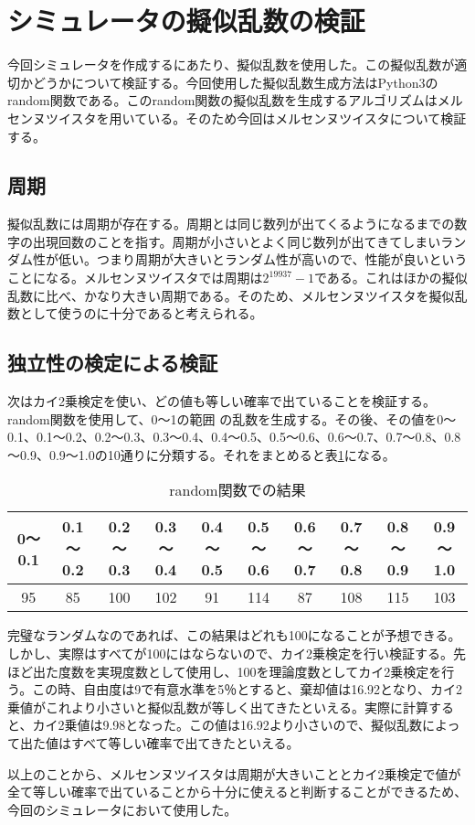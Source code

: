 \section{シミュレータの擬似乱数の検証}
今回シミュレータを作成するにあたり、擬似乱数を使用した。この擬似乱数が適切かどうかについて検証する。今回使用した擬似乱数生成方法はPython3のrandom関数である。このrandom関数の擬似乱数を生成するアルゴリズムはメルセンヌツイスタを用いている。そのため今回はメルセンヌツイスタについて検証する。
\subsection{周期}
擬似乱数には周期が存在する。周期とは同じ数列が出てくるようになるまでの数字の出現回数のことを指す。周期が小さいとよく同じ数列が出てきてしまいランダム性が低い。つまり周期が大きいとランダム性が高いので、性能が良いということになる。メルセンヌツイスタでは周期は$2^{19937}-1$である。これはほかの擬似乱数に比べ、かなり大きい周期である。そのため、メルセンヌツイスタを擬似乱数として使うのに十分であると考えられる。
\subsection{独立性の検定による検証}
次はカイ2乗検定を使い、どの値も等しい確率で出ていることを検証する。random関数を使用して、0～1の範囲
の乱数を生成する。その後、その値を0～0.1、0.1～0.2、0.2～0.3、0.3～0.4、0.4～0.5、0.5～0.6、0.6～0.7、0.7～0.8、0.8～0.9、0.9～1.0の10通りに分類する。それをまとめると表\ref{table:randomresult}になる。
\begin{table}[H]
 \caption{random関数での結果}
 \label{table:randomresult}
 \begin{center}
  \begin{tabular}{|c|c|c|c|c|c|c|c|c|c|}
    \hline    0～0.1 &  0.1～0.2 & 0.2～0.3 & 0.3～0.4 &  0.4～0.5 & 0.5～0.6 & 0.6～0.7 & 0.7～0.8 & 0.8～0.9 & 0.9～1.0 \\
    \hline 95 & 85 & 100 & 102 & 91 & 114 & 87 & 108 & 115 & 103 \\
    \hline
  \end{tabular}
 \end{center}
\end{table}
完璧なランダムなのであれば、この結果はどれも100になることが予想できる。しかし、実際はすべてが100にはならないので、カイ2乗検定を行い検証する。先ほど出た度数を実現度数として使用し、100を理論度数としてカイ2乗検定を行う。この時、自由度は9で有意水準を5％とすると、棄却値は16.92となり、カイ2乗値がこれより小さいと擬似乱数が等しく出てきたといえる。実際に計算すると、カイ2乗値は9.98となった。この値は16.92より小さいので、擬似乱数によって出た値はすべて等しい確率で出てきたといえる。

以上のことから、メルセンヌツイスタは周期が大きいこととカイ2乗検定で値が全て等しい確率で出ていることから十分に使えると判断することができるため、今回のシミュレータにおいて使用した。
